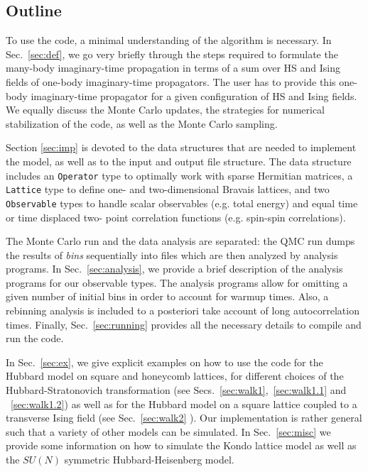 \documentclass{SciPost}
\begin{document}
\subsection{Outline}
%
To use the code, a minimal understanding of the algorithm is necessary. 
In Sec.~\ref{sec:def}, we go very briefly through  the steps required  to formulate the many-body imaginary-time propagation in terms of a sum  over HS and Ising fields  of one-body  imaginary-time propagators.   
The user has to provide this one-body imaginary-time propagator for a given configuration of   HS and  Ising fields. 
We equally discuss the Monte Carlo updates, the strategies for numerical stabilization of the code, as well as the Monte Carlo sampling.

Section \ref{sec:imp} is devoted to the data structures that are needed to implement the model, as well as to the input and output file structure.   
The data structure includes  an \texttt{Operator} type to  optimally work with sparse Hermitian matrices, a \texttt{Lattice} type  to define one- and two-dimensional Bravais lattices, and   two   \texttt{Observable} types to handle  scalar observables  (e.g. total energy)   and   equal time or time displaced two- point correlation functions (e.g. spin-spin correlations).

The Monte Carlo run and the  data analysis  are separated: the QMC run  dumps the results of \textit{bins}  sequentially into files  which are then analyzed by  analysis programs. In Sec.~\ref{sec:analysis}, we provide a brief description of the analysis programs  for our  observable types.  The analysis programs allow for omitting a given number of initial bins in order to account for warmup times. Also, a rebinning analysis is included  to a posteriori take  account of long autocorrelation times.  Finally, Sec.~\ref{sec:running} provides all the necessary details  to compile and run the code. 


In Sec.~\ref{sec:ex}, we  give explicit examples on how to use the code for  the  Hubbard model on square and honeycomb lattices,  for different choices of the Hubbard-Stratonovich transformation  (see Secs.~\ref{sec:walk1},~\ref{sec:walk1.1} and ~\ref{sec:walk1.2})  as well as for the Hubbard model on a square lattice coupled to a transverse Ising field (see Sec.~\ref{sec:walk2} ).   Our implementation is rather general such that  a variety of other models can be simulated. In Sec.~\ref{sec:misc}   we provide  some information on how to simulate the Kondo lattice model as well as the $SU(N)$ symmetric Hubbard-Heisenberg model. 
\end{document}
